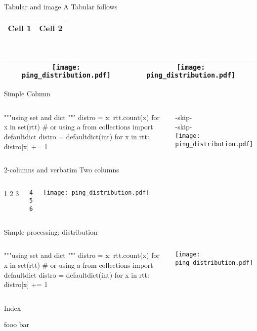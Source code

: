 \begin{pyframe}{Tabular and image}
A Tabular follows \\
\begin{tabular}{|c|c|}\hline
Cell 1 & Cell 2 \\
\hline
\end{tabular}
\\
\begin{table}
\begin{tabular}{|c|c|}\hline
\texttt{[image: ping\_distribution.pdf]}   & \texttt{[image: ping\_distribution.pdf]}  \\
\hline
\end{tabular}
\end{table}
\end{pyframe}

\begin{pyframe}{Simple Column}
\begin{columns}
\column[t]{6cm}
\begin{pycode}
"""using set and dict
"""
distro = {x: rtt.count(x)
  for x in set(rtt)}
# or using a
from collections import defaultdict
distro = defaultdict(int)
for x in rtt:
    distro[x] += 1


\end{pycode}
\column[t]{5cm}
-skip-\\
-skip-\\
\texttt{[image: ping\_distribution.pdf]}
\end{columns}
\end{pyframe}


\begin{pyframe}{2-columns and verbatim}
Two columns
\begin{columns}

\column[t]{5cm}
1
2
3
\begin{verbatim}
4
5
6
\end{verbatim}

\column[t]{5cm}
\texttt{[image: ping\_distribution.pdf]}
\end{columns}

\end{pyframe}



\begin{pyframe}{Simple processing: distribution}
\begin{columns}
\column[t]{6cm}
\begin{pycode}
"""using set and dict """
distro = {x: rtt.count(x)
  for x in set(rtt)}
# or using a
from collections import defaultdict
distro = defaultdict(int)
for x in rtt:
    distro[x] += 1
\end{pycode}
\column[t]{4cm}
\texttt{[image: ping\_distribution.pdf]}
\end{columns}
\end{pyframe}

\begin{pyframe}{Index}

fooo bar

\end{pyframe}
